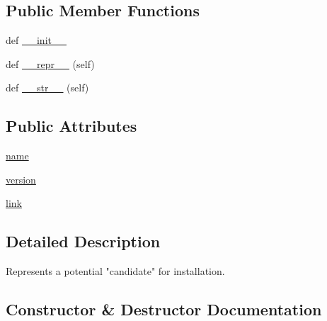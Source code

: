\subsection*{Public Member Functions}
\begin{DoxyCompactItemize}
\item 
def \hyperlink{classpip_1_1__internal_1_1models_1_1candidate_1_1InstallationCandidate_aaa9f561a0066f60bc2ed8612e93facb6}{\+\_\+\+\_\+init\+\_\+\+\_\+}
\item 
def \hyperlink{classpip_1_1__internal_1_1models_1_1candidate_1_1InstallationCandidate_a794631960fba4003580c500a75249972}{\+\_\+\+\_\+repr\+\_\+\+\_\+} (self)
\item 
def \hyperlink{classpip_1_1__internal_1_1models_1_1candidate_1_1InstallationCandidate_aa0d2a2a6c4e37370891d6a34238a0163}{\+\_\+\+\_\+str\+\_\+\+\_\+} (self)
\end{DoxyCompactItemize}
\subsection*{Public Attributes}
\begin{DoxyCompactItemize}
\item 
\hyperlink{classpip_1_1__internal_1_1models_1_1candidate_1_1InstallationCandidate_a155b4f5f9ae914a9451bf98d3ab26cec}{name}
\item 
\hyperlink{classpip_1_1__internal_1_1models_1_1candidate_1_1InstallationCandidate_a04152db2b5bdf963fe67256b4a6063f5}{version}
\item 
\hyperlink{classpip_1_1__internal_1_1models_1_1candidate_1_1InstallationCandidate_a2a1e4af90089d1226a21295ee5d8c270}{link}
\end{DoxyCompactItemize}


\subsection{Detailed Description}
\begin{DoxyVerb}Represents a potential "candidate" for installation.
\end{DoxyVerb}
 

\subsection{Constructor \& Destructor Documentation}
\mbox{\label{classpip_1_1__internal_1_1models_1_1candidate_1_1InstallationCandidate_aaa9f561a0066f60bc2ed8612e93facb6}} 
